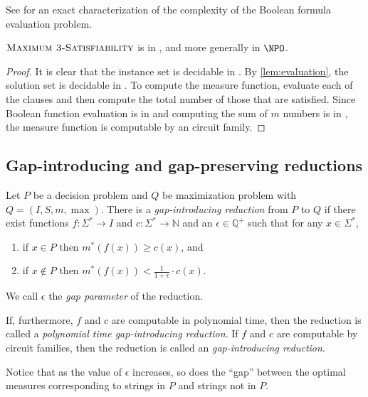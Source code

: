 \documentclass[]{article}
\begin{document}
See \cite{buss87} for an exact characterization of the complexity of the Boolean formula evaluation problem.

\begin{lemma}\label{lem:maxsatnnco}
  $\textsc{Maximum 3-Satisfiability}$ is in \NNCO, and more generally in $\NPO$.
\end{lemma}
\begin{proof}
  It is clear that the instance set is decidable in \NC.
  By \autoref{lem:evaluation}, the solution set is decidable in \NC.
  To compute the measure function, evaluate each of the clauses and then compute the total number of those that are satisfied.
  Since Boolean function evaluation is in \NC{} and computing the sum of $m$ numbers is in \NC, the measure function is computable by an \NC{} circuit family.
\end{proof}

\subsection{Gap-introducing and gap-preserving reductions}\label{ssc:gaps}

\begin{definition}\label{def:intro}
  Let $P$ be a decision problem and $Q$ be maximization problem with $Q = (I, S, m, \max)$.
  There is a \emph{gap-introducing reduction} from $P$ to $Q$ if there exist functions $f \colon \Sigma^* \to I$ and $c \colon \Sigma^* \to \mathbb{N}$ and an $\epsilon \in \mathbb{Q}^+$ such that for any $x \in \Sigma^*$,
  \begin{enumerate}
  \item if $x \in P$ then $m^*(f(x)) \geq c(x)$, and
  \item if $x \notin P$ then $m^*(f(x)) < \frac{1}{1 + \epsilon} \cdot c(x)$.
  \end{enumerate}
  We call $\epsilon$ the \emph{gap parameter} of the reduction.

  If, furthermore, $f$ and $c$ are computable in polynomial time, then the reduction is called a \emph{polynomial time gap-introducing reduction}.
  If $f$ and $c$ are computable by \FNC{} circuit families, then the reduction is called an \emph{\NC{} gap-introducing reduction}.
\end{definition}

Notice that as the value of $\epsilon$ increases, so does the ``gap'' between the optimal measures corresponding to strings in $P$ and strings not in $P$.
\end{document}
